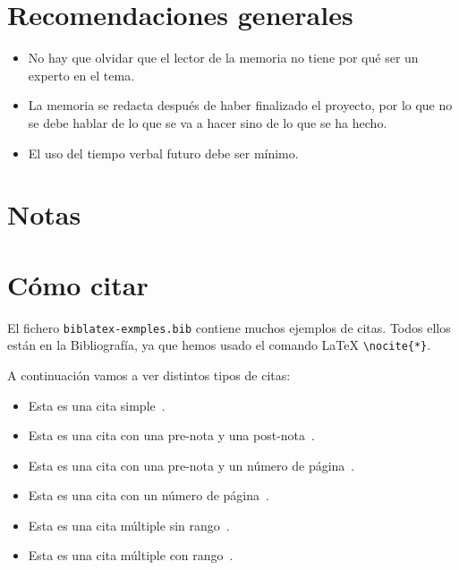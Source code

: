 \documentclass[a4paper,12pt]{report}
\begin{document}
\begin{appendices}

\chapter{Recomendaciones generales}

\begin{itemize}
\item No hay que olvidar que el lector de la memoria no tiene por qué ser un experto en el tema.
\item La memoria se redacta después de haber finalizado el proyecto, por lo que 
no se debe hablar de lo que se va a hacer sino de lo que se ha hecho.
\item El uso del tiempo verbal futuro debe ser mínimo.
\end{itemize}

\chapter{Notas}


\chapter{Cómo citar}

El fichero \texttt{biblatex-exmples.bib} contiene muchos ejemplos de citas. 
Todos ellos están en la Bibliografía, ya que hemos usado el comando \LaTeX{} \texttt{\textbackslash nocite\{*\}}.

A continuación vamos a ver distintos tipos de citas:
\begin{itemize}
    \item Esta es una cita simple~\cite{westfahl:space}.
    \item Esta es una cita con una pre-nota y una post-nota~\cite[pre-nota][post-nota]{westfahl:space}.
    \item Esta es una cita con una pre-nota y un número de página~\cite[pre-nota][42]{westfahl:space}.
    \item Esta es una cita con un número de página~\cite[][42]{westfahl:space}.
    \item Esta es una cita múltiple sin rango~\cites{westfahl:space, aksin}.
    \item Esta es una cita múltiple con rango~\cites{westfahl:space, angenendt, aksin}.
\end{itemize} 


\end{appendices}
\end{document}
